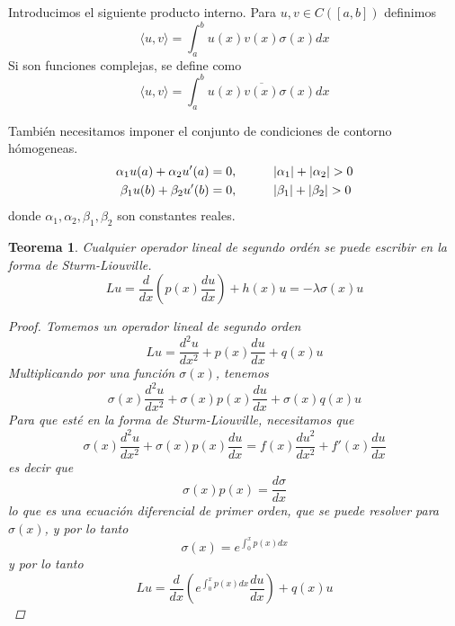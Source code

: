 \documentclass[11pt]{book}
\theoremstyle{plain}
\newtheorem{teo}[proposición]{Teorema}
\theoremstyle{definition}
\begin{document}
Introducimos el siguiente producto interno. Para $u,v \in C([a,b])$ definimos
\[
    \langle u,v \rangle = \int_{a}^{b} u(x)v(x)\sigma(x)dx
\]
Si son funciones complejas, se define como
\[
    \langle u,v \rangle = \int_{a}^{b} u(x)\overline{v(x)}\sigma(x)dx
\]

También necesitamos imponer el conjunto de condiciones de contorno hómogeneas.
\begin{align*}
    \alpha_{1}u(a) + \alpha_{2}u'(a) &= 0, \hspace{10mm} |\alpha_{1}| + |\alpha_{2}| > 0\\
    \beta_{1}u(b) + \beta_{2}u'(b) &= 0, \hspace{10mm} |\beta_{1}| + |\beta_{2}| > 0
\end{align*}
donde $\alpha_{1}, \alpha_{2}, \beta_{1}, \beta_{2}$ son constantes reales.

\begin{teo}
    Cualquier operador lineal de segundo ordén se puede escribir en la forma de Sturm-Liouville.
    \[
        Lu = \frac{d}{dx}\left(p(x)\frac{du}{dx}\right) + h(x)u = -\lambda \sigma(x)u
    \]
    \begin{proof}
        Tomemos un operador lineal de segundo orden
        \[
            Lu = \frac{d^{2}u}{dx^{2}} + p(x)\frac{du}{dx} + q(x)u
        \]
        Multiplicando por una función $\sigma(x)$, tenemos
        \[
            \sigma(x)\frac{d^{2}u}{dx^{2}} + \sigma(x)p(x)\frac{du}{dx} + \sigma(x)q(x)u
        \]
        Para que esté en la forma de Sturm-Liouville, necesitamos que
        \[
            \sigma(x)\frac{d^{2}u}{dx^{2}} + \sigma(x)p(x)\frac{du}{dx} = f(x)\frac{d u^{2}}{dx^{2}} + f'(x)\frac{du}{dx} 
        \]
        es decir que 
        \[
            \sigma(x)p(x) = \frac{d \sigma}{dx}
        \]
        lo que es una ecuación diferencial de primer orden, que se puede resolver para $\sigma(x)$, y por lo tanto
        \[
            \sigma(x) = e^{\int_{0}^{x} p(x)dx}
        \]
        y por lo tanto
        \[
            Lu = \frac{d}{dx}\left(e^{\int_{0}^{x} p(x)dx}\frac{du}{dx}\right) + q(x)u
        \]
    \end{proof}
\end{teo}
\end{document}
